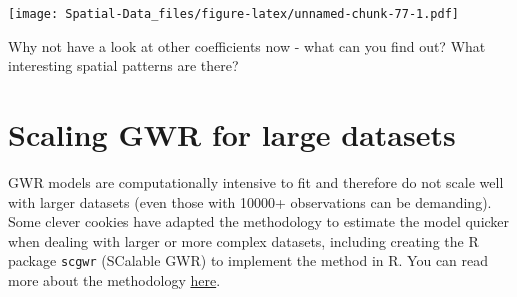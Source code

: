 \documentclass[
]{book}
\newenvironment{Shaded}{\begin{snugshade}}{\end{snugshade}}
\newcommand{\AttributeTok}[1]{\textcolor[rgb]{0.77,0.63,0.00}{#1}}
\newcommand{\CommentTok}[1]{\textcolor[rgb]{0.56,0.35,0.01}{\textit{#1}}}
\newcommand{\DecValTok}[1]{\textcolor[rgb]{0.00,0.00,0.81}{#1}}
\newcommand{\FunctionTok}[1]{\textcolor[rgb]{0.00,0.00,0.00}{#1}}
\newcommand{\NormalTok}[1]{#1}
\newcommand{\OtherTok}[1]{\textcolor[rgb]{0.56,0.35,0.01}{#1}}
\newcommand{\SpecialCharTok}[1]{\textcolor[rgb]{0.00,0.00,0.00}{#1}}
\newcommand{\StringTok}[1]{\textcolor[rgb]{0.31,0.60,0.02}{#1}}
\begin{document}
\begin{Shaded}
\end{Shaded}

\texttt{[image: Spatial-Data\_files/figure-latex/unnamed-chunk-77-1.pdf]}

Why not have a look at other coefficients now - what can you find out? What interesting spatial patterns are there?

\hypertarget{scaling-gwr-for-large-datasets}{%
\section{Scaling GWR for large datasets}\label{scaling-gwr-for-large-datasets}}

GWR models are computationally intensive to fit and therefore do not scale well with larger datasets (even those with 10000+ observations can be demanding). Some clever cookies have adapted the methodology to estimate the model quicker when dealing with larger or more complex datasets, including creating the R package \texttt{scgwr} (SCalable GWR) to implement the method in R. You can read more about the methodology \href{https://www.tandfonline.com/doi/full/10.1080/24694452.2020.1774350}{here}.
\end{document}
